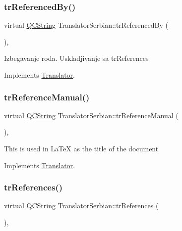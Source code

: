 \subsubsection{\texorpdfstring{trReferencedBy()}{trReferencedBy()}}
{\footnotesize\ttfamily virtual \mbox{\hyperlink{class_q_c_string}{Q\+C\+String}} Translator\+Serbian\+::tr\+Referenced\+By (\begin{DoxyParamCaption}{ }\end{DoxyParamCaption})\hspace{0.3cm}{\ttfamily [inline]}, {\ttfamily [virtual]}}

Izbegavanje roda. Uskladjivanje sa tr\+References

Implements \mbox{\hyperlink{class_translator}{Translator}}.

\mbox{\label{class_translator_serbian_aacc7c3b3d457598eb983e27adb2dcd2e}} 
\subsubsection{\texorpdfstring{trReferenceManual()}{trReferenceManual()}}
{\footnotesize\ttfamily virtual \mbox{\hyperlink{class_q_c_string}{Q\+C\+String}} Translator\+Serbian\+::tr\+Reference\+Manual (\begin{DoxyParamCaption}{ }\end{DoxyParamCaption})\hspace{0.3cm}{\ttfamily [inline]}, {\ttfamily [virtual]}}

This is used in La\+TeX as the title of the document 

Implements \mbox{\hyperlink{class_translator}{Translator}}.

\mbox{\label{class_translator_serbian_a4fb8316e8cc5b607aa53c167807d8790}} 
\subsubsection{\texorpdfstring{trReferences()}{trReferences()}}
{\footnotesize\ttfamily virtual \mbox{\hyperlink{class_q_c_string}{Q\+C\+String}} Translator\+Serbian\+::tr\+References (\begin{DoxyParamCaption}{ }\end{DoxyParamCaption})\hspace{0.3cm}{\ttfamily [inline]}, {\ttfamily [virtual]}}


